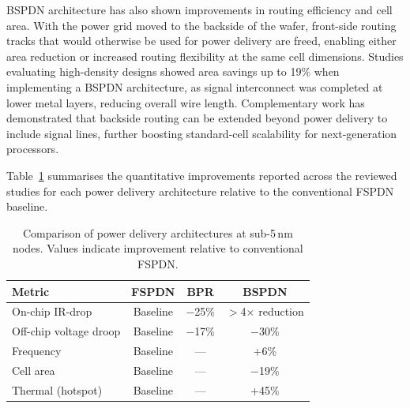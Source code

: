 BSPDN architecture has also shown improvements in routing efficiency and cell area. With the power grid moved to the backside of the wafer, front-side routing tracks that would otherwise be used for power delivery are freed, enabling either area reduction or increased routing flexibility at the same cell dimensions. Studies evaluating high-density designs showed area savings up to 19\% when implementing a BSPDN architecture, as signal interconnect was completed at lower metal layers, reducing overall wire length\cite{10631463}. Complementary work has demonstrated that backside routing can be extended beyond power delivery to include signal lines, further boosting standard-cell scalability for next-generation processors\cite{11192533}.

Table~\ref{tab:comparison} summarises the quantitative improvements reported across the reviewed studies for each power delivery architecture relative to the conventional FSPDN baseline.

\begin{table}[h]
\centering
\caption{Comparison of power delivery architectures at sub-5\,nm nodes. Values indicate improvement relative to conventional FSPDN.}
\label{tab:comparison}
\begin{tabular}{|l|c|c|c|}
\hline
\textbf{Metric} & \textbf{FSPDN} & \textbf{BPR} & \textbf{BSPDN} \\
\hline
On-chip IR-drop & Baseline & $-$25\%\cite{9817394} & $>$4$\times$ reduction\cite{8932458} \\
\hline
Off-chip voltage droop & Baseline & $-$17\%\cite{9817394} & $-$30\%\cite{10185208} \\
\hline
Frequency & Baseline & --- & +6\%\cite{10185208} \\
\hline
Cell area & Baseline & --- & $-$19\%\cite{10631463} \\
\hline
Thermal (hotspot) & Baseline & --- & +45\%\cite{10925422} \\
\hline
\end{tabular}
\end{table}
